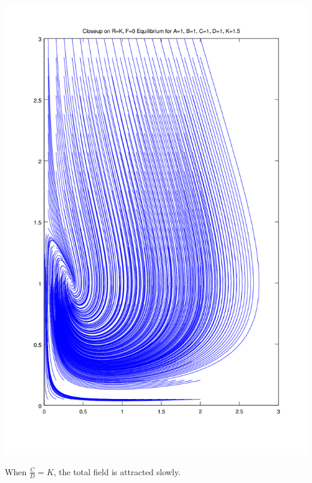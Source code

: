 \documentclass{article}
\begin{document}
\includegraphics[width=\textwidth]{plots/phase-potrait-near-degenerate.png}

When $\frac{C}{D} = K$, the total field is attracted slowly.
\end{document}
